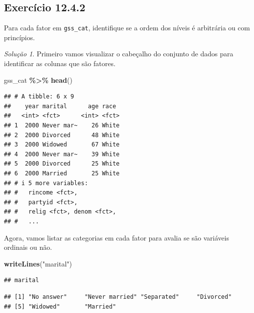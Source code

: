 \documentclass[
]{latex/krantz}
\newenvironment{Shaded}{\begin{snugshade}}{\end{snugshade}}
\newcommand{\FunctionTok}[1]{\textcolor[rgb]{0.13,0.29,0.53}{\textbf{#1}}}
\newcommand{\NormalTok}[1]{#1}
\newcommand{\SpecialCharTok}[1]{\textcolor[rgb]{0.81,0.36,0.00}{\textbf{#1}}}
\newcommand{\StringTok}[1]{\textcolor[rgb]{0.31,0.60,0.02}{#1}}
\theoremstyle{definition}
\theoremstyle{definition}
\theoremstyle{definition}
\theoremstyle{definition}
\theoremstyle{remark}
\newtheorem*{solution}{Solução}
\begin{document}
\hypertarget{exr12-4-2}{%
\subsection*{Exercício 12.4.2}\label{exr12-4-2}}

Para cada fator em \texttt{gss\_cat}, identifique se a ordem dos níveis é arbitrária ou com princípios.

\begin{solution}
Primeiro vamos visualizar o cabeçalho do conjunto de dados para identificar as colunas que são fatores.

\begin{Shaded}
\begin{Highlighting}[]
\NormalTok{gss\_cat }\SpecialCharTok{\%\textgreater{}\%}
  \FunctionTok{head}\NormalTok{()}
\end{Highlighting}
\end{Shaded}

\begin{verbatim}
## # A tibble: 6 x 9
##    year marital      age race 
##   <int> <fct>      <int> <fct>
## 1  2000 Never mar~    26 White
## 2  2000 Divorced      48 White
## 3  2000 Widowed       67 White
## 4  2000 Never mar~    39 White
## 5  2000 Divorced      25 White
## 6  2000 Married       25 White
## # i 5 more variables:
## #   rincome <fct>,
## #   partyid <fct>,
## #   relig <fct>, denom <fct>,
## #   ...
\end{verbatim}

Agora, vamos listar as categorias em cada fator para avalia se são variáveis ordinais ou não.

\begin{Shaded}
\begin{Highlighting}[]
\FunctionTok{writeLines}\NormalTok{(}\StringTok{"marital"}\NormalTok{)}
\end{Highlighting}
\end{Shaded}

\begin{verbatim}
## marital
\end{verbatim}

\begin{Shaded}
\end{Shaded}

\begin{verbatim}
## [1] "No answer"     "Never married" "Separated"     "Divorced"     
## [5] "Widowed"       "Married"
\end{verbatim}


\end{solution}
\end{document}
